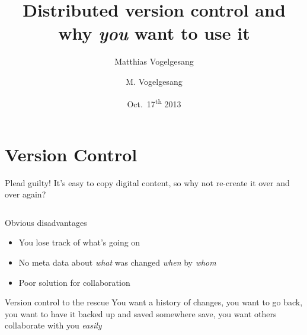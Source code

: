 \documentclass[18pt]{beamer}
\title{Distributed version control and why \emph{you} want to use it}
\author{M. Vogelgesang}
\subtitle{Matthias Vogelgesang}
\institute{Institute for Data Processing and Electronics}
\date{Oct.~17\textsuperscript{th} 2013}
\begin{document}
\maketitle

\section{Version Control}

\begin{frame}{Plead guilty!}
  It's easy to copy digital content, so why not re-create it over and over
  again?

  \begin{columns}[onlytextwidth]

  \end{columns}
\end{frame}
\begin{frame}{Obvious disadvantages}
  \begin{itemize}
    \item You lose track of what's going on
    \item No meta data about \emph{what} was changed \emph{when} by
      \emph{whom}
    \item Poor solution for collaboration
  \end{itemize}
\end{frame}
\begin{frame}{Version control to the rescue}
  You want a history of changes, you want to go back, you want to have it backed
  up and saved somewhere save, you want others collaborate with you
  \emph{easily}
\end{frame}
\end{document}
